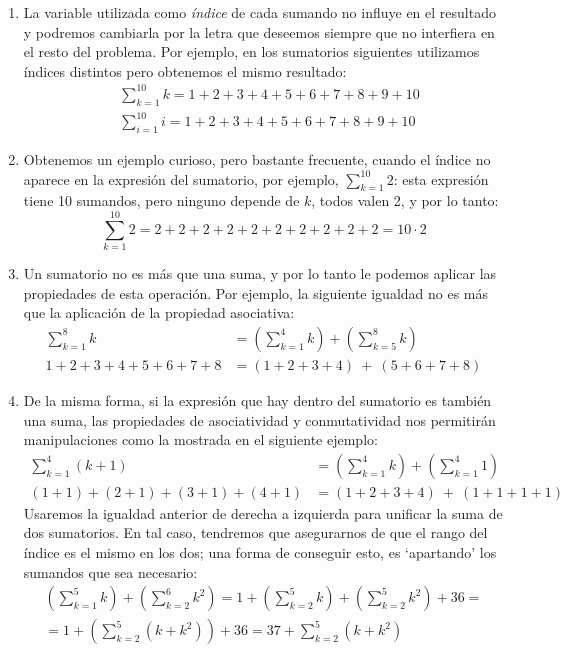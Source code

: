 \begin{ejemplo-br}
\begin{enumerate}
\item
La variable utilizada como \emph{índice} de cada sumando no influye en el resultado y podremos cambiarla por la letra que deseemos siempre que no interfiera en el resto del problema.
Por ejemplo, en los sumatorios siguientes utilizamos índices distintos pero obtenemos el mismo resultado:
\begin{align*}
& \sum_{k=1}^{10}k=1+2+3+4+5+6+7+8+9+10 \\
& \sum_{i=1}^{10}i=1+2+3+4+5+6+7+8+9+10
\end{align*}
\item
Obtenemos un ejemplo curioso, pero bastante frecuente, cuando el índice no aparece en la expresión del sumatorio, por ejemplo, $\displaystyle\sum_{k=1}^{10}2$: esta expresión tiene 10 sumandos, pero ninguno depende de $k$, todos valen 2, y por lo tanto:
\[
\sum_{k=1}^{10}2=2+2+2+2+2+2+2+2+2+2=10\cdot 2
\]
\item
Un sumatorio no es más que una suma, y por lo tanto le podemos aplicar las propiedades de esta operación.
Por ejemplo, la siguiente igualdad no es más que la  aplicación de la propiedad asociativa:
\begin{align*}
 \sum_{k=1}^{8}k & = \left(\sum_{k=1}^{4}k\right) +\left(\sum_{k=5}^{8}k\right) \\
1+2+3+4+5+6+7+8 & = (1+2+3+4)\ +\ (5+6+7+8)
\end{align*}

\item
De la misma forma, si la expresión que hay dentro del sumatorio es también una suma, las propiedades de asociatividad y conmutatividad nos permitirán manipulaciones como la mostrada en el siguiente ejemplo:
\begin{align*}
\sum_{k=1}^{4}(k+1) & = \left(\sum_{k=1}^{4}k\right) +\left(\sum_{k=1}^{4}1\right) \\
(1+1)+(2+1)+(3+1)+(4+1) & = (1+2+3+4)\ +\ (1+1+1+1)
\end{align*}
Usaremos la igualdad anterior de derecha a izquierda para unificar la suma de dos sumatorios.
En tal caso, tendremos que asegurarnos de que el rango del índice es el mismo en los dos;
una forma de conseguir esto, es `apartando' los sumandos que sea necesario:
\begin{multline*}
\left(\sum_{k=1}^{5}k\right) + \left(\sum_{k=2}^{6}k^2\right) =
1+\left(\sum_{k=2}^{5}k\right) + \left(\sum_{k=2}^{5}k^2\right) + 36=\\
=1+\left(\sum_{k=2}^{5}(k+k^2)\right) + 36
=37+ \sum_{k=2}^{5}(k+k^2)
\end{multline*}



\end{enumerate}
\end{ejemplo-br}
